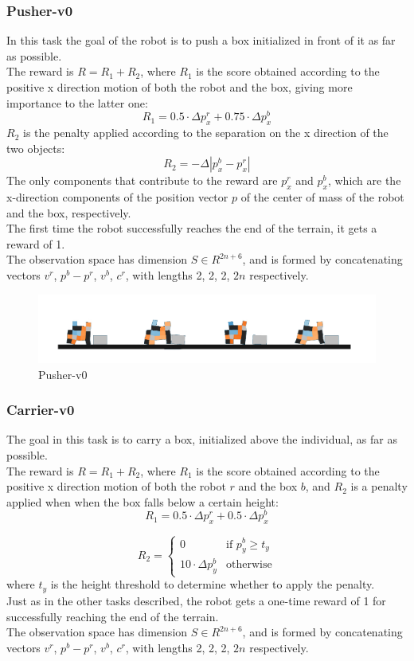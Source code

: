 \subsubsection{Pusher-v0}
In this task the goal of the robot is to push a box initialized in front of it as far as possible.\\
The reward is $R = R_1 + R_2$, where $R_1$ is the score obtained according to the positive x direction motion of both the robot and the box, giving more importance to the latter one:
\[R_1 = 0.5 \cdot \Delta p^r_x + 0.75 \cdot \Delta p^b_x\]
$R_2$ is the penalty applied according to the separation on the x direction of the two objects:
\[R_2 = -\Delta |p^b_x - p^r_x|\]
The only components that contribute to the reward are $p^r_x$ and $p^b_x$, which are the x-direction components of the position vector $p$ of the center of mass of the robot and the box, respectively.\\
The first time the robot successfully reaches the end of the terrain, it gets a reward of 1.\\
The observation space has dimension $S \in R^{2n+6}$, and is formed by concatenating vectors $v^r$, $p^b - p^r$, $v^b$, $c^r$, with lengths 2, 2, 2, $2n$ respectively.

\begin{figure}[H]
    \centering
    \includegraphics[scale=0.9]{images/task_pusher.pdf}
    \caption{Pusher-v0}
    \label{fig:task_pusher}
\end{figure}


\subsubsection{Carrier-v0}
The goal in this task is to carry a box, initialized above the individual, as far as possible.\\
The reward is $R = R_1 + R_2$, where $R_1$ is the score obtained according to the positive x direction motion of both the robot $r$ and the box $b$, and $R_2$ is a penalty applied when when the box falls below a certain height:
\[R_1 = 0.5 \cdot \Delta p^r_x + 0.5 \cdot \Delta p^b_x\]

\[R_2 =\begin{cases}
        0 & \text{if } p^b_y \geq t_y\\
        10 \cdot \Delta p^b_y & \text{otherwise}
    \end{cases}
    \]
where $t_y$ is the height threshold to determine whether to apply the penalty.\\
Just as in the other tasks described, the robot gets a one-time reward of 1 for successfully reaching the end of the terrain.\\
The observation space has dimension $S \in R^{2n+6}$, and is formed by concatenating vectors $v^r$, $p^b - p^r$, $v^b$, $c^r$, with lengths 2, 2, 2, $2n$ respectively.

